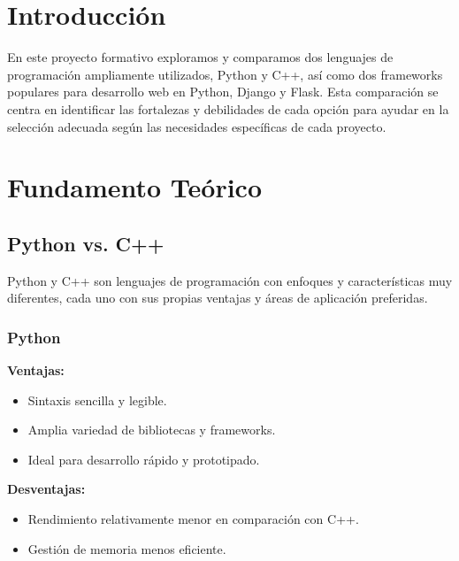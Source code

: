 \documentclass[12pt, a4paper]{article}
\begin{document}
	\newpage
	
	\section*{Introducción}
	
	En este proyecto formativo exploramos y comparamos dos lenguajes de programación ampliamente utilizados, Python y C++, así como dos frameworks populares para desarrollo web en Python, Django y Flask. Esta comparación se centra en identificar las fortalezas y debilidades de cada opción para ayudar en la selección adecuada según las necesidades específicas de cada proyecto.
	
	\vspace{0.5cm}
	
	\section*{Fundamento Teórico}
	
	\subsection*{Python vs. C++}
	
	Python y C++ son lenguajes de programación con enfoques y características muy diferentes, cada uno con sus propias ventajas y áreas de aplicación preferidas.
	
	\vspace{0.5cm}
	
	\subsubsection*{Python}
	
	\textbf{Ventajas:}
	\begin{itemize}
		\item Sintaxis sencilla y legible.
		\item Amplia variedad de bibliotecas y frameworks.
		\item Ideal para desarrollo rápido y prototipado.
	\end{itemize}
	
	\textbf{Desventajas:}
	\begin{itemize}
		\item Rendimiento relativamente menor en comparación con C++.
		\item Gestión de memoria menos eficiente.
	\end{itemize}
	
\end{document}
